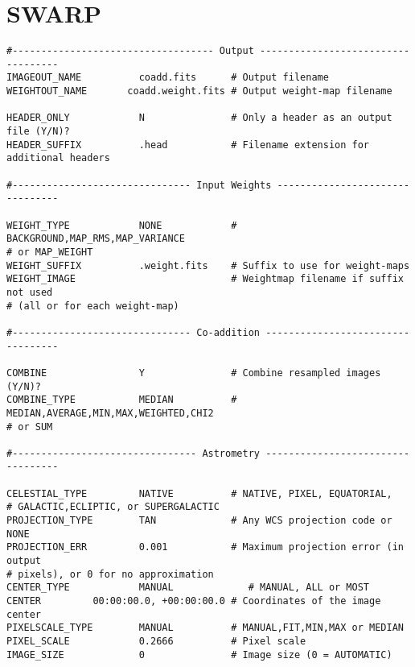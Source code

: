 \documentclass[apj, revtex4]{emulateapj}
\begin{document}




\appendix

\section{SWARP}\label{app:swarp}
\begin{verbatim}
#----------------------------------- Output -----------------------------------
IMAGEOUT_NAME          coadd.fits      # Output filename
WEIGHTOUT_NAME       coadd.weight.fits # Output weight-map filename

HEADER_ONLY            N               # Only a header as an output file (Y/N)?
HEADER_SUFFIX          .head           # Filename extension for additional headers

#------------------------------- Input Weights --------------------------------

WEIGHT_TYPE            NONE            # BACKGROUND,MAP_RMS,MAP_VARIANCE
# or MAP_WEIGHT
WEIGHT_SUFFIX          .weight.fits    # Suffix to use for weight-maps
WEIGHT_IMAGE                           # Weightmap filename if suffix not used
# (all or for each weight-map)

#------------------------------- Co-addition ----------------------------------

COMBINE                Y               # Combine resampled images (Y/N)?
COMBINE_TYPE           MEDIAN          # MEDIAN,AVERAGE,MIN,MAX,WEIGHTED,CHI2
# or SUM

#-------------------------------- Astrometry ----------------------------------

CELESTIAL_TYPE         NATIVE          # NATIVE, PIXEL, EQUATORIAL,
# GALACTIC,ECLIPTIC, or SUPERGALACTIC
PROJECTION_TYPE        TAN             # Any WCS projection code or NONE
PROJECTION_ERR         0.001           # Maximum projection error (in output
# pixels), or 0 for no approximation
CENTER_TYPE            MANUAL             # MANUAL, ALL or MOST
CENTER         00:00:00.0, +00:00:00.0 # Coordinates of the image center
PIXELSCALE_TYPE        MANUAL          # MANUAL,FIT,MIN,MAX or MEDIAN
PIXEL_SCALE            0.2666          # Pixel scale
IMAGE_SIZE             0               # Image size (0 = AUTOMATIC)


\end{verbatim}
\end{document}
